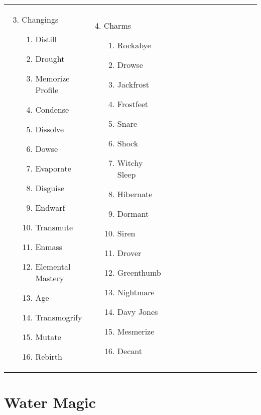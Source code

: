 \begin{tabular}{@{} p{0.25\linewidth} p{0.25\linewidth} p{0.25\linewidth} p{0.25\linewidth}}
\begin{enumerate}
	\setcounter{enumi}{2}
	\item Changings
	\begin{enumerate}
		\item Distill
		\item Drought
		\item Memorize Profile
		\item Condense
		\item Dissolve
		\item Dowse
		\item Evaporate
		\item Disguise
		\item Endwarf
		\item Transmute
		\item Enmass
		\item Elemental Mastery
		\item Age
		\item Transmogrify
		\item Mutate
		\item Rebirth
	\end{enumerate}
\end{enumerate} &
\begin{enumerate}
	\setcounter{enumi}{3}
	\item Charms
	\begin{enumerate}
		\item Rockabye
		\item Drowse
		\item Jackfrost
		\item Frostfeet
		\item Snare
		\item Shock
		\item Witchy Sleep
		\item Hibernate
		\item Dormant
		\item Siren
		\item Drover
		\item Greenthumb
		\item Nightmare
		\item Davy Jones
		\item Mesmerize
		\item Decant
	\end{enumerate}
\end{enumerate} \\
\end{tabular}
\pagebreak
\section{Water Magic}

